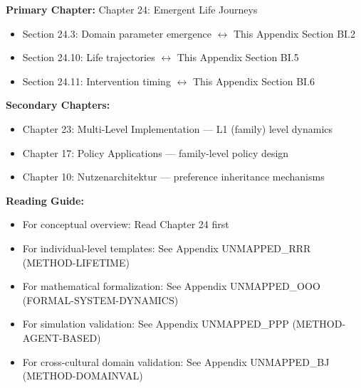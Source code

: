 
\begin{tcolorbox}[colback=purple!5!white, colframe=purple!75!black,
    title=Chapter Linkage]

\textbf{Primary Chapter:} Chapter 24: Emergent Life Journeys
\begin{itemize}[nosep]
\item Section 24.3: Domain parameter emergence $\leftrightarrow$ This Appendix Section BI.2
\item Section 24.10: Life trajectories $\leftrightarrow$ This Appendix Section BI.5
\item Section 24.11: Intervention timing $\leftrightarrow$ This Appendix Section BI.6
\end{itemize}

\textbf{Secondary Chapters:}
\begin{itemize}[nosep]
\item Chapter 23: Multi-Level Implementation --- L1 (family) level dynamics
\item Chapter 17: Policy Applications --- family-level policy design
\item Chapter 10: Nutzenarchitektur --- preference inheritance mechanisms
\end{itemize}

\textbf{Reading Guide:}
\begin{itemize}[nosep]
\item For conceptual overview: Read Chapter 24 first
\item For individual-level templates: See Appendix UNMAPPED_RRR (METHOD-LIFETIME)
\item For mathematical formalization: See Appendix UNMAPPED_OOO (FORMAL-SYSTEM-DYNAMICS)
\item For simulation validation: See Appendix UNMAPPED_PPP (METHOD-AGENT-BASED)
\item For cross-cultural domain validation: See Appendix UNMAPPED_BJ (METHOD-DOMAINVAL)
\end{itemize}

\end{tcolorbox}


